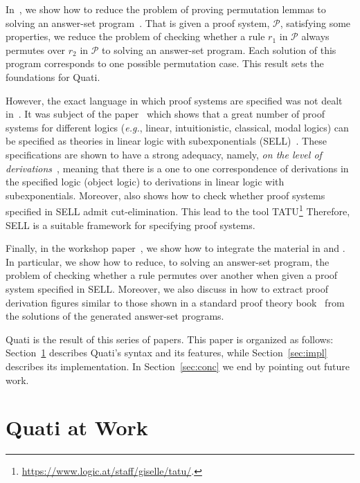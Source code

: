 \documentclass{llncs}
\newcommand\Pscr{\mathcal{P}}
\newcommand{\eg}{{\em e.g.}}
\begin{document}
In~\cite{nigam13iclp}, we show how to reduce the problem of proving permutation
lemmas to solving an answer-set program~\cite{gelfond90iclp}. That is given a proof
system, $\Pscr$, satisfying some properties, we reduce the problem 
of checking whether a rule $r_1$ in $\Pscr$ always permutes over $r_2$ in
$\Pscr$ to solving an answer-set program. Each solution of this program
corresponds to one possible permutation case. This result sets the foundations 
for Quati.

However, the exact language in which proof systems are specified was not dealt
in~\cite{nigam13iclp}. It was subject of the paper~\cite{nigam.jlc} which
shows that a great number of proof systems for different logics (\eg, linear,
intuitionistic, classical, modal logics) can be specified as theories in linear
logic with subexponentials (SELL)~\cite{nigam09ppdp}. These specifications are shown to
have a strong adequacy, namely, \emph{on the level of
derivations}~\cite{nigam10jar}, meaning that there is a one to one
correspondence of derivations in the specified logic (object logic) to derivations in linear
logic with subexponentials. Moreover, \cite{nigam.jlc} also shows how to check whether 
proof systems specified in SELL admit cut-elimination. This lead to the tool 
TATU\footnote{\url{https://www.logic.at/staff/giselle/tatu/}.} Therefore, SELL is
a suitable framework for specifying proof systems. 

Finally, in the workshop paper~\cite{nigam14ebl}, we show how to integrate the material
in \cite{nigam13iclp} and \cite{nigam.jlc}. In particular, we show how to reduce,
to solving an answer-set program, the problem of checking whether a rule permutes
over another when given a proof system specified in SELL. 
Moreover, we also discuss in \cite{nigam14ebl} how to extract
proof derivation figures similar to those shown in a standard proof theory
book~\cite{troelstra96bpt} from the solutions of the generated answer-set programs. 

Quati is the result of this series of papers. This paper is organized as follows: Section~\ref{sec:quati} describes
Quati's syntax and its features, while Section~\ref{sec:impl} describes its implementation.
In Section~\ref{sec:conc} we end by pointing out future work.

\vspace{-4mm}

\section{Quati at Work}
\label{sec:quati}
\end{document}
